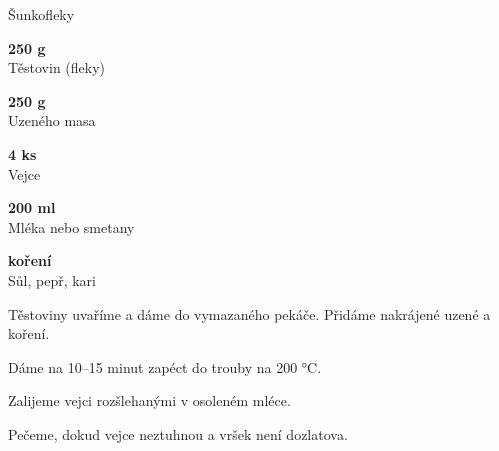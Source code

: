\documentclass[11pt,a4paper]{article}
\begin{document}
\begin{recipe}[Goldenrod]{Šunkofleky}
    \begin{ingredients}
        \item \parbox[t]{\linewidth}{\raggedright \weight \textbf{250 g}\\ Těstovin (fleky)}
        \item \parbox[t]{\linewidth}{\raggedright \weight \textbf{250 g}\\ Uzeného masa}
        \item \parbox[t]{\linewidth}{\raggedright \piece \textbf{4 ks}\\ Vejce}
        \item \parbox[t]{\linewidth}{\raggedright \liquid \textbf{200 ml}\\ Mléka nebo smetany}
        \item \parbox[t]{\linewidth}{\raggedright \indefinite \textbf{koření}\\ Sůl, pepř, kari}
    \end{ingredients}
    \begin{steps}
        \item Těstoviny uvaříme a dáme do vymazaného pekáče. Přidáme nakrájené uzené a koření.
        \item Dáme na 10--15 minut zapéct do trouby na 200 °C.
        \item Zalijeme vejci rozšlehanými v osoleném mléce.
        \item Pečeme, dokud vejce neztuhnou a vršek není dozlatova.
    \end{steps}
\end{recipe}
\end{document}
